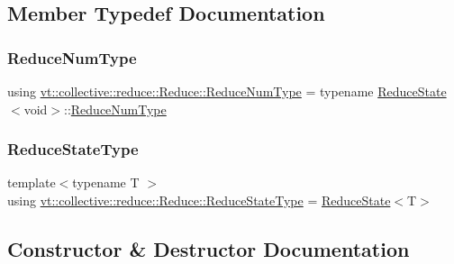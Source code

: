 \subsection{Member Typedef Documentation}
\mbox{\label{structvt_1_1collective_1_1reduce_1_1_reduce_a6fd4d5e956ac5acd321e57c7dad5131f}} 
\subsubsection{\texorpdfstring{Reduce\+Num\+Type}{ReduceNumType}}
{\footnotesize\ttfamily using \hyperlink{structvt_1_1collective_1_1reduce_1_1_reduce_a6fd4d5e956ac5acd321e57c7dad5131f}{vt\+::collective\+::reduce\+::\+Reduce\+::\+Reduce\+Num\+Type} =  typename \hyperlink{structvt_1_1collective_1_1reduce_1_1_reduce_state}{Reduce\+State}$<$void$>$\+::\hyperlink{structvt_1_1collective_1_1reduce_1_1_reduce_a6fd4d5e956ac5acd321e57c7dad5131f}{Reduce\+Num\+Type}}

\mbox{\label{structvt_1_1collective_1_1reduce_1_1_reduce_ac4dc9abaf561d3989a8516e761263fab}} 
\subsubsection{\texorpdfstring{Reduce\+State\+Type}{ReduceStateType}}
{\footnotesize\ttfamily template$<$typename T $>$ \\
using \hyperlink{structvt_1_1collective_1_1reduce_1_1_reduce_ac4dc9abaf561d3989a8516e761263fab}{vt\+::collective\+::reduce\+::\+Reduce\+::\+Reduce\+State\+Type} =  \hyperlink{structvt_1_1collective_1_1reduce_1_1_reduce_state}{Reduce\+State}$<$T$>$}



\subsection{Constructor \& Destructor Documentation}
\mbox{\label{structvt_1_1collective_1_1reduce_1_1_reduce_a1a3dc3704014f244b5344e320fee0c2e}} 
